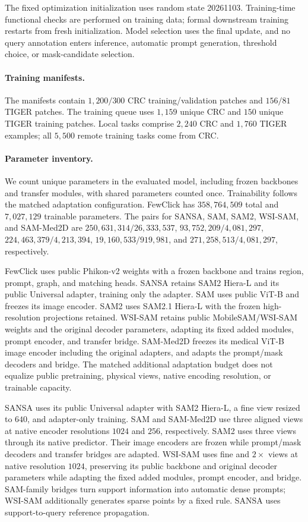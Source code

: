 The fixed optimization initialization uses random state 20261103. Training-time functional checks are performed on training data; formal downstream training restarts from fresh initialization. Model selection uses the final update, and no query annotation enters inference, automatic prompt generation, threshold choice, or mask-candidate selection.


\paragraph{Training manifests.}
The manifests contain $1{,}200/300$ CRC training/validation patches and $156/81$ TIGER patches. The training queue uses $1{,}159$ unique CRC and $150$ unique TIGER training patches. Local tasks comprise $2{,}240$ CRC and $1{,}760$ TIGER examples; all $5{,}500$ remote training tasks come from CRC.

\paragraph{Parameter inventory.}
We count unique parameters in the evaluated model, including frozen backbones and transfer modules, with shared parameters counted once. Trainability follows the matched adaptation configuration. FewClick has $358{,}764{,}509$ total and $7{,}027{,}129$ trainable parameters. The pairs for SANSA, SAM, SAM2, WSI-SAM, and SAM-Med2D are $250{,}631{,}314/26{,}333{,}537$, $93{,}752{,}209/4{,}081{,}297$, $224{,}463{,}379/4{,}213{,}394$, $19{,}160{,}533/919{,}981$, and $271{,}258{,}513/4{,}081{,}297$, respectively.

FewClick uses public Phikon-v2 weights with a frozen backbone and trains region, prompt, graph, and matching heads. SANSA retains SAM2 Hiera-L and its public Universal adapter, training only the adapter. SAM uses public ViT-B and freezes its image encoder. SAM2 uses SAM2.1 Hiera-L with the frozen high-resolution projections retained. WSI-SAM retains public MobileSAM/WSI-SAM weights and the original decoder parameters, adapting its fixed added modules, prompt encoder, and transfer bridge. SAM-Med2D freezes its medical ViT-B image encoder including the original adapters, and adapts the prompt/mask decoders and bridge. The matched additional adaptation budget does not equalize public pretraining, physical views, native encoding resolution, or trainable capacity.

SANSA uses its public Universal adapter with SAM2 Hiera-L, a fine view resized to $640$, and adapter-only training. SAM and SAM-Med2D use three aligned views at native encoder resolutions $1024$ and $256$, respectively. SAM2 uses three views through its native predictor. Their image encoders are frozen while prompt/mask decoders and transfer bridges are adapted. WSI-SAM uses fine and $2\times$ views at native resolution $1024$, preserving its public backbone and original decoder parameters while adapting the fixed added modules, prompt encoder, and bridge. SAM-family bridges turn support information into automatic dense prompts; WSI-SAM additionally generates sparse points by a fixed rule. SANSA uses support-to-query reference propagation.

